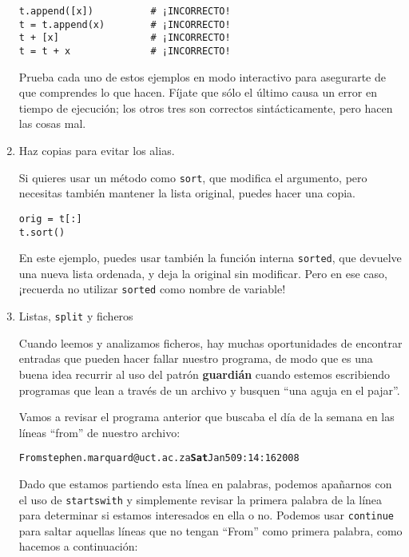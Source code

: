 \begin{enumerate}
\beforeverb
\begin{verbatim}
t.append([x])          # ¡INCORRECTO!
t = t.append(x)        # ¡INCORRECTO!
t + [x]                # ¡INCORRECTO!
t = t + x              # ¡INCORRECTO!
\end{verbatim}
\afterverb

Prueba cada uno de estos ejemplos en modo interactivo para asegurarte
de que comprendes lo que hacen. Fíjate que sólo el último
causa un error en tiempo de ejecución; los otros tres son correctos sintácticamente, pero
hacen las cosas mal.


\item Haz copias para evitar los alias.


Si quieres usar un método como {\tt sort}, que modifica
el argumento, pero necesitas también mantener la lista original,
puedes hacer una copia.

\beforeverb
\begin{verbatim}
orig = t[:]
t.sort()
\end{verbatim}
\afterverb

En este ejemplo, puedes usar también la función interna {\tt sorted},
que devuelve una nueva lista ordenada, y deja la original sin modificar.
Pero en ese caso, ¡recuerda no utilizar {\tt sorted} como nombre de
variable!

\item Listas, {\tt split} y ficheros

Cuando leemos y analizamos ficheros, hay muchas oportunidades
de encontrar entradas que pueden hacer fallar nuestro programa, de modo que
es una buena idea recurrir al uso del patrón {\bf guardián} cuando
estemos escribiendo programas que lean a través de un archivo
y busquen ``una aguja en el pajar''.

Vamos a revisar el programa anterior que buscaba el día de la semana
en las líneas ``from'' de nuestro archivo:

\beforeverb
\begin{alltt}
From stephen.marquard@uct.ac.za {\bf Sat} Jan  5 09:14:16 2008
\end{alltt}
\afterverb

Dado que estamos partiendo esta línea en palabras, podemos apañarnos
con el uso de {\tt startswith} y simplemente revisar la
primera palabra de la línea para determinar si estamos interesados
en ella o no. Podemos usar {\tt continue} para saltar aquellas
líneas que no tengan ``From'' como primera palabra, como hacemos
a continuación:


\end{enumerate}
